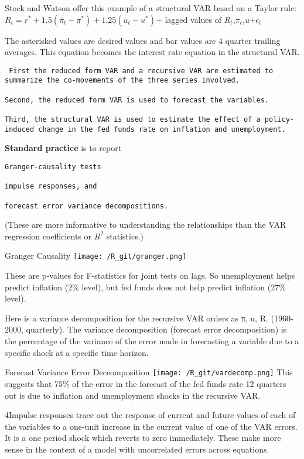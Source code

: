 \documentclass[
  ignorenonframetext,
]{beamer}
\begin{document}
\begin{frame}[fragile]
Stock and Watson offer this example of a structural VAR based on a
Taylor rule:
\(R_t= r^*+1.5({\overline \pi_t - \pi^*})+1.25({\overline u_t - u^*})\)+
lagged values of \(R_t\),\(\pi_t\),\emph{u}+\(\epsilon_t\)

The asterisked values are desired values and bar values are 4 quarter
trailing averages. This equation becomes the interest rate equation in
the structural VAR.

\begin{verbatim}
 First the reduced form VAR and a recursive VAR are estimated to summarize the co-movements of the three series involved. 

Second, the reduced form VAR is used to forecast the variables. 

Third, the structural VAR is used to estimate the effect of a policy-induced change in the fed funds rate on inflation and unemployment. 
\end{verbatim}

\textbf{Standard practice} is to report

\begin{verbatim}
Granger-causality tests

impulse responses, and 

forecast error variance decompositions. 
\end{verbatim}

(These are more informative to understanding the relationships than the
VAR regression coefficients or \(R^2\) statistics.)
\end{frame}

\begin{frame}{Granger Causality}
\protect\hypertarget{granger-causality}{}
\texttt{[image: /R\_git/granger.png]}

These are p-values for F-statistics for joint tests on lags. So
unemployment helps predict inflation (2\% level), but fed funds does not
help predict inflation (27\% level).

Here is a variance decomposition for the recursive VAR orders as π, u,
R. (1960-2000, quarterly). The variance decomposition (forecast error
decomposition) is the percentage of the variance of the error made in
forecasting a variable due to a specific shock at a specific time
horizon.
\end{frame}

\begin{frame}{Forecast Variance Error Deceomposition}
\protect\hypertarget{forecast-variance-error-deceomposition}{}
\texttt{[image: /R\_git/vardecomp.png]} This suggests that 75\% of the
error in the forecast of the fed funds rate 12 quarters out is due to
inflation and unemployment shocks in the recursive VAR.

4Impulse responses trace out the response of current and future values
of each of the variables to a one-unit increase in the current value of
one of the VAR errors. It is a one period shock which reverts to zero
immediately. These make more sense in the context of a model with
uncorrelated errors across equations.
\end{frame}
\end{document}
